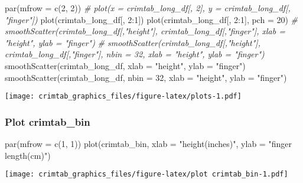 \documentclass[
]{article}
\newenvironment{Shaded}{\begin{snugshade}}{\end{snugshade}}
\newcommand{\AttributeTok}[1]{\textcolor[rgb]{0.77,0.63,0.00}{#1}}
\newcommand{\CommentTok}[1]{\textcolor[rgb]{0.56,0.35,0.01}{\textit{#1}}}
\newcommand{\DecValTok}[1]{\textcolor[rgb]{0.00,0.00,0.81}{#1}}
\newcommand{\FunctionTok}[1]{\textcolor[rgb]{0.00,0.00,0.00}{#1}}
\newcommand{\NormalTok}[1]{#1}
\newcommand{\SpecialCharTok}[1]{\textcolor[rgb]{0.00,0.00,0.00}{#1}}
\newcommand{\StringTok}[1]{\textcolor[rgb]{0.31,0.60,0.02}{#1}}
\begin{document}
\begin{Shaded}
\begin{Highlighting}[]
\FunctionTok{par}\NormalTok{(}\AttributeTok{mfrow =} \FunctionTok{c}\NormalTok{(}\DecValTok{2}\NormalTok{, }\DecValTok{2}\NormalTok{))}
\CommentTok{\# plot(x = crimtab\_long\_df[, 2], y = crimtab\_long\_df[, "finger"])}
\FunctionTok{plot}\NormalTok{(crimtab\_long\_df[, }\DecValTok{2}\SpecialCharTok{:}\DecValTok{1}\NormalTok{])}
\FunctionTok{plot}\NormalTok{(crimtab\_long\_df[, }\DecValTok{2}\SpecialCharTok{:}\DecValTok{1}\NormalTok{], }
     \AttributeTok{pch =} \DecValTok{20}\NormalTok{)}
\CommentTok{\# smoothScatter(crimtab\_long\_df[,"height"], crimtab\_long\_df[,"finger"], xlab = "height", ylab = "finger")}
\CommentTok{\# smoothScatter(crimtab\_long\_df[,"height"], crimtab\_long\_df[,"finger"], nbin = 32, xlab = "height", ylab = "finger")}
\FunctionTok{smoothScatter}\NormalTok{(crimtab\_long\_df, }
              \AttributeTok{xlab =} \StringTok{"height"}\NormalTok{, }
              \AttributeTok{ylab =} \StringTok{"finger"}\NormalTok{)}
\FunctionTok{smoothScatter}\NormalTok{(crimtab\_long\_df, }
              \AttributeTok{nbin =} \DecValTok{32}\NormalTok{, }
              \AttributeTok{xlab =} \StringTok{"height"}\NormalTok{, }
              \AttributeTok{ylab =} \StringTok{"finger"}\NormalTok{)}
\end{Highlighting}
\end{Shaded}

\texttt{[image: crimtab\_graphics\_files/figure-latex/plots-1.pdf]}

\hypertarget{plot-crimtab_bin}{%
\subsubsection{Plot crimtab\_bin}\label{plot-crimtab_bin}}

\begin{Shaded}
\begin{Highlighting}[]
\FunctionTok{par}\NormalTok{(}\AttributeTok{mfrow =} \FunctionTok{c}\NormalTok{(}\DecValTok{1}\NormalTok{, }\DecValTok{1}\NormalTok{))}
\FunctionTok{plot}\NormalTok{(crimtab\_bin, }
     \AttributeTok{xlab =} \StringTok{"height(inches)"}\NormalTok{, }
     \AttributeTok{ylab =} \StringTok{"finger length(cm)"}\NormalTok{)}
\end{Highlighting}
\end{Shaded}

\texttt{[image: crimtab\_graphics\_files/figure-latex/plot crimtab\_bin-1.pdf]}
\end{document}
